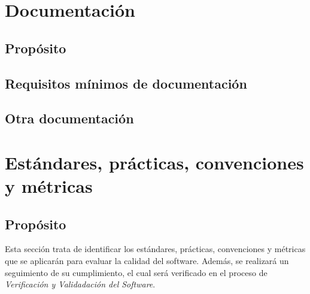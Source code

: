 \documentclass[11pt, a4paper, twoside, titlepage]{article}
\begin{document}
	\section{Documentación} %
		\subsection{Propósito} 
		\subsection{Requisitos mínimos de documentación} 
		\subsection{Otra documentación} 
	\section{Estándares, prácticas, convenciones y métricas}%
		\subsection{Propósito}
			Esta sección trata de identificar los estándares, prácticas, convenciones y métricas que se aplicarán para evaluar la calidad del software. Además, se realizará un seguimiento de su cumplimiento, el cual será verificado en el proceso de  \textit{Verificación y Validadación del Software}.
\end{document}
